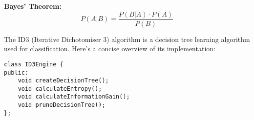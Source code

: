 %     
%     
    
    \textbf{Bayes' Theorem:}
    \[
    P(A | B) = \frac{P(B | A) \cdot P(A)}{P(B)}
    \]

\pagebreak

The ID3 (Iterative Dichotomiser 3) algorithm is a decision tree learning algorithm used for classification. Here's a concise overview of its implementation:

\begin{lstlisting}[caption={ID3 Engine Declaration}]
class ID3Engine {
public:
    void createDecisionTree();
    void calculateEntropy();
    void calculateInformationGain();
    void pruneDecisionTree();
};
\end{lstlisting}

